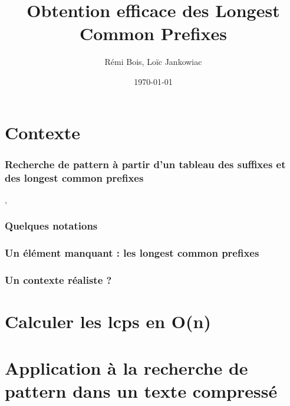 \documentclass[10pt]{beamer}
\title{Obtention efficace des Longest Common Prefixes}
\author{Rémi Bois, Loïc Jankowiac}
\date{\today}
\begin{document}
\begin{frame}
  \maketitle

\end{frame}

\begin{frame}
  \tableofcontents
\end{frame}

\section{Contexte}
\label{sec:context}



\begin{frame}
  \frametitle{Recherche de pattern à partir d'un tableau des suffixes
    et des longest common prefixes}
  \cite{Manber93}, \cite{Raffinot11}
  
\end{frame}

\begin{frame}
  \frametitle{Quelques notations}
\end{frame}

\begin{frame}
  \frametitle{Un élément manquant : les longest common prefixes}
  \cite{Kasai01}
\end{frame}


\begin{frame}
  \frametitle{Un contexte réaliste ?}
\end{frame}

\section{Calculer les lcps en O(n)}
\label{sec:algo}



\section{Application à la recherche de pattern dans un texte compressé}
\label{sec:appcompress}
\end{document}
